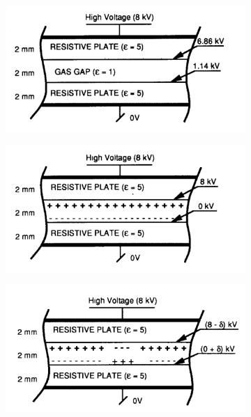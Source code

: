 \begingroup\setlength{\intextsep}{5pt}\setlength{\columnsep}{15pt}
	
	\begin{figure}
		\begin{subfigure}{\linewidth}
			\centering
			\includegraphics[width = \linewidth]{fig/chapt3/RPC_Charging_1.png}
			\caption{\label{fig:ElecCharge:A}}
		\end{subfigure}
		\begin{subfigure}{\linewidth}
			\centering
			\includegraphics[width = \linewidth]{fig/chapt3/RPC_Charging_2.png}\\
			\caption{\label{fig:ElecCharge:B}}
		\end{subfigure}
		\begin{subfigure}{\linewidth}
			\centering
			\includegraphics[width = \linewidth]{fig/chapt3/RPC_Charging_3.png}

\end{subfigure}
\end{figure}
